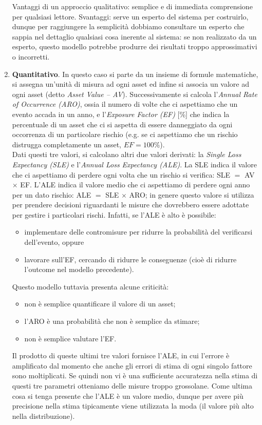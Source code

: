 \begin{enumerate}
\begin{enumerate}
	\end{enumerate}
	Vantaggi di un approccio qualitativo: semplice e di immediata comprensione per qualsiasi lettore. Svantaggi: serve un esperto del sistema per costruirlo, dunque per raggiungere la semplicità dobbiamo consultare un esperto che sappia nel dettaglio qualsiasi cosa inerente al sistema: se non realizzato da un esperto, questo modello potrebbe produrre dei risultati troppo approssimativi o incorretti.
	\item \textbf{Quantitativo}. In questo caso si parte da un insieme di formule matematiche, si assegna un'unità di misura ad ogni asset ed infine si associa un valore ad ogni asset (detto \textit{Asset Value -- AV}). Successivamente si calcola l'\textit{Annual Rate of Occurrence (ARO)}, ossia il numero di volte che ci aspettiamo che un evento accada in un anno, e l'\textit{Exposure Factor (EF)} [\%] che indica la percentuale di un asset che ci si aspetta di essere danneggiato da ogni occorrenza di un particolare rischio (e.g. se ci aspettiamo che un rischio distrugga completamente un asset, $EF=100\%$).\\
	Dati questi tre valori, si calcolano altri due valori derivati: la \textit{Single Loss Expectancy (SLE)} e l'\textit{Annual Loss Expectancy (ALE)}. La SLE indica il valore che ci aspettiamo di perdere ogni volta che un rischio si verifica: SLE $ = $ AV $\times$ EF. L'ALE indica il valore medio che ci aspettiamo di perdere ogni anno per un dato rischio: ALE $ = $ SLE $\times$ ARO; in genere questo valore si utilizza per prendere decisioni riguardanti le misure che dovrebbero essere adottate per gestire i particolari rischi. Infatti, se l'ALE è alto è possibile:
	\begin{itemize}
		\item implementare delle contromisure per ridurre la probabilità del verificarsi dell'evento, oppure
		\item lavorare sull'EF, cercando di ridurre le conseguenze (cioè di ridurre l'outcome nel modello precedente).
	\end{itemize}
	Questo modello tuttavia presenta alcune criticità:
	\begin{itemize}
		\item non è semplice quantificare il valore di un asset;
		\item l'ARO è una probabilità che non è semplice da stimare;
		\item non è semplice valutare l'EF.
	\end{itemize}
	Il prodotto di queste ultimi tre valori fornisce l'ALE, in cui l'errore è amplificato dal momento che anche gli errori di stima di ogni singolo fattore sono moltiplicati. Se quindi non vi è una sufficiente accuratezza nella stima di questi tre parametri otteniamo delle misure troppo grossolane. Come ultima cosa si tenga presente che l'ALE è un valore medio, dunque per avere più precisione nella stima tipicamente viene utilizzata la moda (il valore più alto nella distribuzione).
\end{enumerate}
